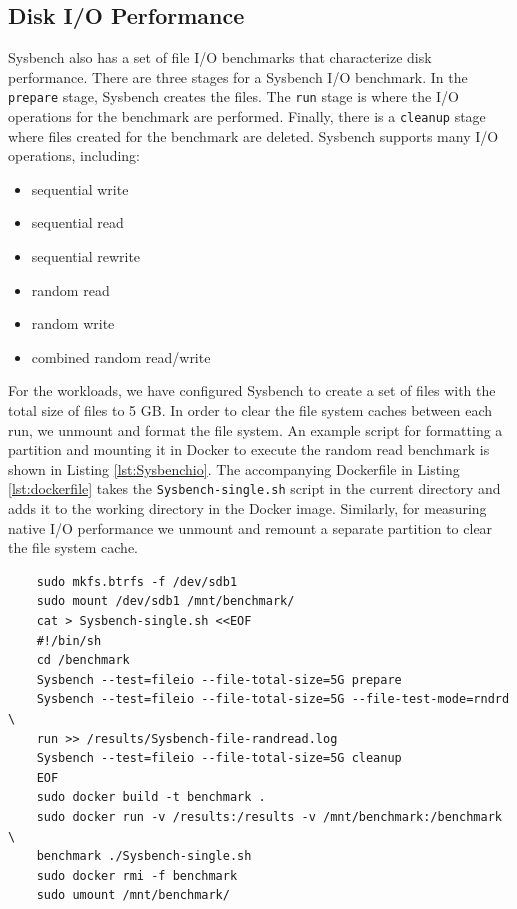 \documentclass[11pt]{article}
\begin{document}
	\subsection{Disk I/O Performance}
	Sysbench also has a set of file I/O benchmarks that characterize disk performance. There are three stages for a Sysbench I/O benchmark. In the \texttt{prepare} stage, Sysbench creates the files. The \texttt{run} stage is where the I/O operations for the benchmark are performed. Finally, there is a \texttt{cleanup} stage where files created for the benchmark are deleted. Sysbench supports many I/O operations, including:
	\begin{itemize}
		\item sequential write
		\item sequential read
		\item sequential rewrite
		\item random read
		\item random write
		\item combined random read/write
	\end{itemize}
	For the workloads, we have configured Sysbench to create a set of files with the total size of files to 5 GB. In order to clear the file system caches between each run, we unmount and format the file system. An example script for formatting a partition and mounting it in Docker to execute the random read benchmark is shown in Listing \ref{lst:Sysbenchio}. The accompanying Dockerfile in Listing \ref{lst:dockerfile} takes the \texttt{Sysbench-single.sh} script in the current directory and adds it to the working directory in the Docker image. Similarly, for measuring native I/O performance we unmount and remount a separate partition to clear the file system cache. 
	
	\lstset{caption=Sysbench File I/O Random Read Bash Script, label=lst:Sysbenchio}
	\begin{lstlisting}
	sudo mkfs.btrfs -f /dev/sdb1
	sudo mount /dev/sdb1 /mnt/benchmark/
	cat > Sysbench-single.sh <<EOF
	#!/bin/sh
	cd /benchmark
	Sysbench --test=fileio --file-total-size=5G prepare
	Sysbench --test=fileio --file-total-size=5G --file-test-mode=rndrd \
	run >> /results/Sysbench-file-randread.log
	Sysbench --test=fileio --file-total-size=5G cleanup
	EOF
	sudo docker build -t benchmark .
	sudo docker run -v /results:/results -v /mnt/benchmark:/benchmark \
	benchmark ./Sysbench-single.sh
	sudo docker rmi -f benchmark
	sudo umount /mnt/benchmark/
	\end{lstlisting}
	
\end{document}
